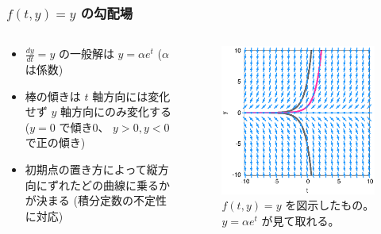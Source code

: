 \documentclass[dvipdfmx,aspectratio=169,20pt]{beamer}
\newcommand{\myfontsetting}[3]{{\fontsize{#1}{#2}\selectfont #3}}
\begin{document}
\begin{frame}
\frametitle{\myfontsetting{28pt}{28pt}{[図解] $f(t,y) = y$ の勾配場}}
\begin{columns}[t]
\begin{column}{0.48\textwidth} 
\vspace{-8mm}
\begin{itemize}
    \item 
    \myfontsetting{12pt}{12pt}{
    $\frac{dy}{dt} = y$ の一般解は $y=\alpha e^t$ \myfontsetting{10pt}{10pt}{($\alpha$ は係数)}
    }
    \vspace{-1mm}
    \item 
    \myfontsetting{12pt}{12pt}{
    棒の傾きは $t$ 軸方向には変化せず $y$ 軸方向にのみ変化する
    }\\
    \vspace{-2mm}
    \myfontsetting{6pt}{6pt}{
    ($y=0$ で傾き0、 $y>0, y<0$ で正の傾き)
    }
    \vspace{-1mm}
    \item \myfontsetting{12pt}{12pt}{
        初期点の置き方によって縦方向にずれたどの曲線に乗るかが決まる
        \myfontsetting{10pt}{10pt}{(積分定数の不定性に対応)}
        }
\end{itemize}
\end{column}

\begin{column}{0.52\textwidth} 
\begin{figure}[h]
	\begin{center}
\vspace{-10mm}
    	\includegraphics[width=1.0\textwidth]{fig12-6_differential_equation_y.eps}
	\end{center}
	\vspace{-5mm}
	\caption{\myfontsetting{10pt}{10pt}{$f(t,y)=y$ を図示したもの。$y=\alpha e^t$ が見て取れる。}}
\end{figure}
\end{column}
\end{columns}
\end{frame}
\end{document}
